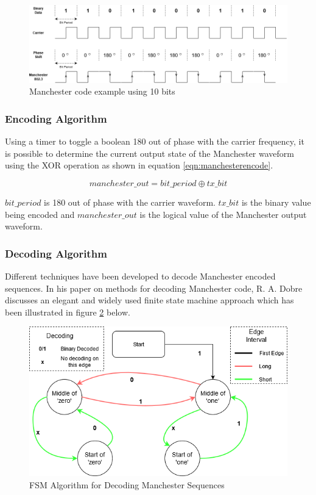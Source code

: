 \begin{figure}[H]
	\centering
	\includegraphics[width=0.7\linewidth]{figures/litreview/manchester_encoding}
	\caption{Manchester code example using 10 bits}
	\label{fig:manchesterencoding}
\end{figure}

\subsubsection{Encoding Algorithm}

Using a timer to toggle a boolean 180\textdegree{} out of phase with the carrier frequency, it is possible to determine the current output state of the Manchester waveform using the XOR operation as shown in equation \ref{eqn:manchesterencode}.

\begin{equation}
	\label{eqn:manchesterencode}
	manchester\_out = bit\_period \oplus tx\_bit
\end{equation}

$bit\_period$ is 180\textdegree{} out of phase with the carrier waveform. $tx\_bit$ is the binary value being encoded and $manchester\_out$ is the logical value of the Manchester output waveform.


\subsubsection{Decoding Algorithm}
Different techniques have been developed to decode Manchester encoded sequences. In his paper on methods for decoding Manchester code, R. A. Dobre discusses an elegant and widely used finite state machine approach which has been illustrated in figure \ref{fig:manchesterdecodingfsm} below. \cite{Dobre2014}

\begin{figure}[H]
	\centering
	\includegraphics[width=0.7\linewidth]{figures/litreview/manchester_decoding_fsm.png}
	\caption{FSM Algorithm for Decoding Manchester Sequences}
	\label{fig:manchesterdecodingfsm}
\end{figure}

